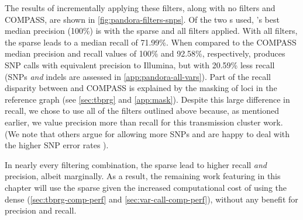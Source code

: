 The results of incrementally applying these filters, along with no filters and COMPASS, are shown in \autoref{fig:pandora-filters-snps}. Of the two \panrg{}s used, \pandora{}'s best median precision (100\%) is with the sparse \panrg{} and all filters applied. With all filters, the sparse \panrg{} leads to a median recall of 71.99\%. When compared to the COMPASS median precision and recall values of 100\% and 92.58\%, respectively, \pandora{} produces \ont{} SNP calls with equivalent precision to Illumina, but with 20.59\% less recall (SNPs \emph{and} indels are assessed in \autoref{app:pandora-all-vars}). Part of the recall disparity between \pandora{} and COMPASS is explained by the masking of loci in the reference graph (see \autoref{sec:tbprg} and \autoref{app:mask}). Despite this large difference in recall, we chose to use all of the filters outlined above because, as mentioned earlier, we value \ont{} precision more than recall for this transmission cluster work. (We note that others argue for allowing more SNPs and are happy to deal with the higher SNP error rates \cite{walter2020}).

In nearly every filtering combination, the sparse \panrg{} lead to higher recall \emph{and} precision, albeit marginally. As a result, the remaining work featuring \pandora{} in this chapter will use the sparse \panrg{} given the increased computational cost of using the dense \panrg{} (\autoref{sec:tbprg-comp-perf} and \autoref{sec:var-call-comp-perf}), without any benefit for precision and recall.

